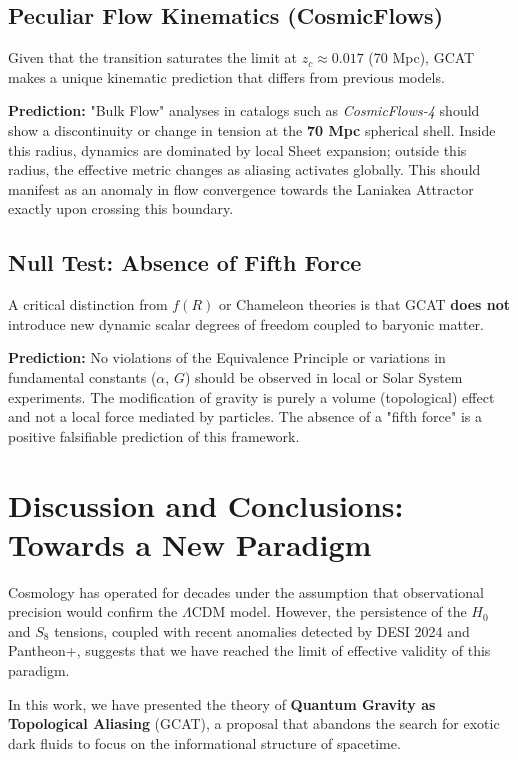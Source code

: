 \documentclass[12pt, a4paper]{article}
\theoremstyle{plain}
\theoremstyle{definition}
\begin{document}
\subsection{Peculiar Flow Kinematics (CosmicFlows)}

Given that the transition saturates the limit at $z_c \approx 0.017$ (70 Mpc), GCAT makes a unique kinematic prediction that differs from previous models.

\textbf{Prediction:} "Bulk Flow" analyses in catalogs such as \textit{Cosmic\-Flows-4} should show a discontinuity or change in tension at the \textbf{70 Mpc} spherical shell. Inside this radius, dynamics are dominated by local Sheet expansion; outside this radius, the effective metric changes as aliasing activates globally. This should manifest as an anomaly in flow convergence towards the Laniakea Attractor exactly upon crossing this boundary.

\subsection{Null Test: Absence of Fifth Force}

A critical distinction from $f(R)$ or Chameleon theories is that GCAT \textbf{does not} introduce new dynamic scalar degrees of freedom coupled to baryonic matter.

\textbf{Prediction:} No violations of the Equivalence Principle or variations in fundamental constants ($\alpha$, $G$) should be observed in local or Solar System experiments. The modification of gravity is purely a volume (topological) effect and not a local force mediated by particles. The absence of a "fifth force" is a positive falsifiable prediction of this framework.

\section{Discussion and Conclusions: Towards a New Paradigm}
\label{sec:conclusions}

Cosmology has operated for decades under the assumption that observational precision would confirm the $\Lambda$CDM model. However, the persistence of the $H_0$ and $S_8$ tensions, coupled with recent anomalies detected by DESI 2024 and Pantheon+, suggests that we have reached the limit of effective validity of this paradigm.

In this work, we have presented the theory of \textbf{Quantum Gravity as Topological Aliasing} (GCAT), a proposal that abandons the search for exotic dark fluids to focus on the informational structure of spacetime.
\end{document}
